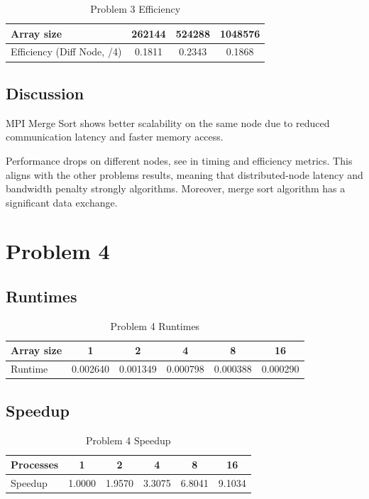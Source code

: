 \documentclass[11pt]{article}
\begin{document}
\begin{table}[htbp]
\caption{Problem 3 Efficiency}
\centering
\begin{tabular}{|l|c|c|c|}
\hline
Array size & 262144 & 524288 & 1048576\\
\hline
Efficiency (Diff Node, /4) & 0.1811 & 0.2343 & 0.1868\\
\hline
\end{tabular}
\end{table}
\subsection{Discussion}
\label{sec:orgaba21be}

MPI Merge Sort shows better scalability on the same node due to reduced communication latency and faster memory access.

Performance drops on different nodes, see in timing and efficiency metrics. This aligns with the other problems results, meaning that distributed-node latency and bandwidth penalty strongly algorithms. Moreover, merge sort algorithm has a significant data exchange.
\newpage
\section{Problem 4}
\label{sec:org1e20f56}

\subsection{Runtimes}
\label{sec:orgdc0bfe8}

\begin{table}[htbp]
\caption{Problem 4 Runtimes}
\centering
\begin{tabular}{|l|c|c|c|c|c|}
\hline
Array size & 1 & 2 & 4 & 8 & 16\\
\hline
Runtime & 0.002640 & 0.001349 & 0.000798 & 0.000388 & 0.000290\\
\hline
\end{tabular}
\end{table}
\subsection{Speedup}
\label{sec:orgee9c0e3}

\begin{table}[htbp]
\caption{Problem 4 Speedup}
\centering
\begin{tabular}{|l|c|c|c|c|c|}
\hline
Processes & 1 & 2 & 4 & 8 & 16\\
\hline
Speedup & 1.0000 & 1.9570 & 3.3075 & 6.8041 & 9.1034\\
\hline
\end{tabular}
\end{table}
\end{document}
